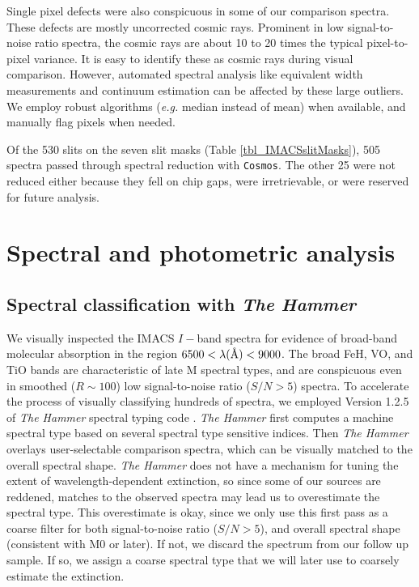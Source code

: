 Single pixel defects were also conspicuous in some of our comparison spectra.  These defects are mostly uncorrected cosmic rays.  Prominent in low signal-to-noise ratio spectra, the cosmic rays are about 10 to 20 times the typical pixel-to-pixel variance.  It is easy to identify these as cosmic rays during visual comparison.  However, automated spectral analysis like equivalent width measurements and continuum estimation can be affected by these large outliers.  We employ robust algorithms (\emph{e.g.} median instead of mean) when available, and manually flag pixels when needed.

Of the 530 slits on the seven slit masks (Table \ref{tbl_IMACSslitMasks}), 505 spectra passed through spectral reduction with \texttt{Cosmos}.  The other 25 were not reduced either because they fell on chip gaps, were irretrievable, or were reserved for future analysis.

\section{Spectral and photometric analysis}

\subsection{Spectral classification with \emph{The Hammer}}
We visually inspected the IMACS $I-$band spectra for evidence of broad-band molecular absorption in the region $6500<\lambda(\mbox{\normalfont\AA})<9000 $.  The broad FeH, VO, and TiO bands are characteristic of late M spectral types, and are conspicuous even in smoothed ($R\sim100$) low signal-to-noise ratio ($S/N > 5$) spectra.  To accelerate the process of visually classifying hundreds of spectra, we employed Version 1.2.5 of \emph{The Hammer} spectral typing code \citep{2007AJ....134.2398C,2011AJ....141...97W}.  \emph{The Hammer} first computes a machine spectral type based on several spectral type sensitive indices.  Then \emph{The Hammer} overlays user-selectable comparison spectra, which can be visually matched to the overall spectral shape.  \emph{The Hammer} does not have a mechanism for tuning the extent of wavelength-dependent extinction, so since some of our sources are reddened, matches to the observed spectra may lead us to overestimate the spectral type.  This overestimate is okay, since we only use this first pass as a coarse filter for both signal-to-noise ratio ($S/N >5$), and overall spectral shape (consistent with M0 or later).  If not, we discard the spectrum from our follow up sample.  If so, we assign a coarse spectral type that we will later use to coarsely estimate the extinction.

